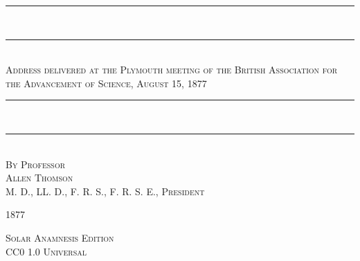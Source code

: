 \documentclass[a4paper, 11pt, oneside, english]{article}
\begin{document}
\begin{titlepage}
    \centering                     %

    \rule{\textwidth}{1.6pt}\\[-\baselineskip]\vskip2pt
    \rule{\textwidth}{0.4pt}\\[1\baselineskip]

    {\scshape\Huge Address delivered at the Plymouth meeting of the British Association for the Advancement of Science, August 15, 1877}\\[1\baselineskip]

    \rule{\textwidth}{0.4pt}\\[-\baselineskip]\vskip3.2pt
    \rule{\textwidth}{1.6pt}\\[1\baselineskip]

    
    {\scshape By Professor \\\Large Allen Thomson\\\normalsize M. D., LL. D., F. R. S., F. R. S. E., President}




    \vfill

    {\scshape 1877}

    {\scshape Solar Anamnesis Edition}\\[0.2\baselineskip]
    {\scshape\small CC0 1.0 Universal}
\end{titlepage}
\setlength{\parskip}{1mm plus1mm minus1mm}
\clearpage
\end{document}
